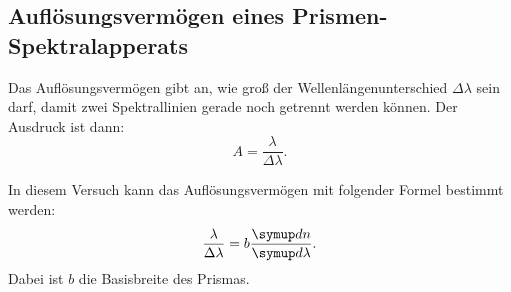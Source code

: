 \subsection{Auflösungsvermögen eines Prismen-Spektralapperats}

Das Auflösungsvermögen gibt an, wie groß der Wellenlängenunterschied $\Delta\lambda$ sein darf, damit
zwei Spektrallinien gerade noch getrennt werden können. Der Ausdruck ist dann:
\begin{equation*}
  A = \frac{\lambda}{\Delta\lambda}.
\end{equation*}

In diesem Versuch kann das Auflösungsvermögen mit folgender Formel bestimmt werden:
\begin{equation}
  \frac{\lambda}{\Delta\lambda} = b \frac{\g{d}n}{\g{d}\lambda}.
  \label{eqn:Aufloesung}
\end{equation}
Dabei ist $b$ die Basisbreite des Prismas.


\cite{anleitung}
